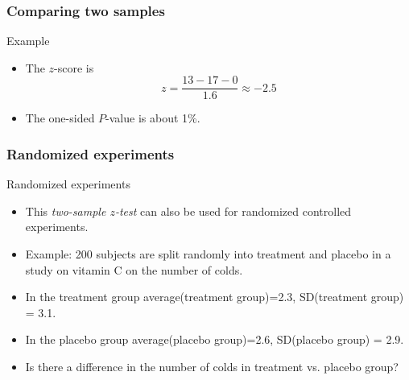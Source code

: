 \documentclass[handout]{beamer}
\begin{document}

   \begin{frame} \frametitle{Comparing two samples}

   \begin{block}
   {Example}
   \begin{itemize}
   \item The $z$-score is
   $$
   z = \frac{13 - 17 - 0}{1.6} \approx -2.5
   $$

   \item The one-sided $P$-value is about 1\%.

   \end{itemize}
   \end{block}
   \end{frame}


   \begin{frame} \frametitle{Randomized experiments}

   \begin{block}
   {Randomized experiments}
   \begin{itemize}
   \item This {\em two-sample $z$-test} can also be used
   for randomized controlled experiments.

   \item Example:  200 subjects are split randomly into treatment
   and placebo in a study on vitamin C on the number of colds.

   \item In the treatment group average(treatment group)=2.3,
   SD(treatment group) = 3.1.

   \item In the placebo group average(placebo group)=2.6,
   SD(placebo group) = 2.9.

   \item Is there a difference in the number of colds in treatment
   vs. placebo group?


   \end{itemize}
   \end{block}
   \end{frame}

\end{document}
